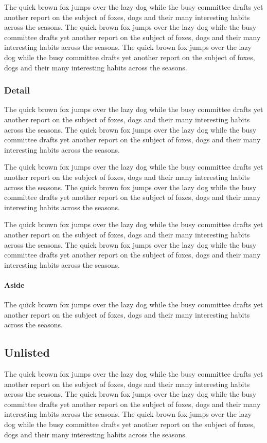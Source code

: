 \documentclass{article}
\begin{document}
The quick brown fox jumps over the lazy dog while the busy committee drafts yet another report on the subject of foxes, dogs and their many interesting habits across the seasons. The quick brown fox jumps over the lazy dog while the busy committee drafts yet another report on the subject of foxes, dogs and their many interesting habits across the seasons. The quick brown fox jumps over the lazy dog while the busy committee drafts yet another report on the subject of foxes, dogs and their many interesting habits across the seasons. 

\subsubsection{Detail}
The quick brown fox jumps over the lazy dog while the busy committee drafts yet another report on the subject of foxes, dogs and their many interesting habits across the seasons. The quick brown fox jumps over the lazy dog while the busy committee drafts yet another report on the subject of foxes, dogs and their many interesting habits across the seasons. 

The quick brown fox jumps over the lazy dog while the busy committee drafts yet another report on the subject of foxes, dogs and their many interesting habits across the seasons. The quick brown fox jumps over the lazy dog while the busy committee drafts yet another report on the subject of foxes, dogs and their many interesting habits across the seasons. 

The quick brown fox jumps over the lazy dog while the busy committee drafts yet another report on the subject of foxes, dogs and their many interesting habits across the seasons. The quick brown fox jumps over the lazy dog while the busy committee drafts yet another report on the subject of foxes, dogs and their many interesting habits across the seasons. 

\paragraph{Aside} The quick brown fox jumps over the lazy dog while the busy committee drafts yet another report on the subject of foxes, dogs and their many interesting habits across the seasons. 
\subsection*{Unlisted}
The quick brown fox jumps over the lazy dog while the busy committee drafts yet another report on the subject of foxes, dogs and their many interesting habits across the seasons. The quick brown fox jumps over the lazy dog while the busy committee drafts yet another report on the subject of foxes, dogs and their many interesting habits across the seasons. The quick brown fox jumps over the lazy dog while the busy committee drafts yet another report on the subject of foxes, dogs and their many interesting habits across the seasons. 
\end{document}

